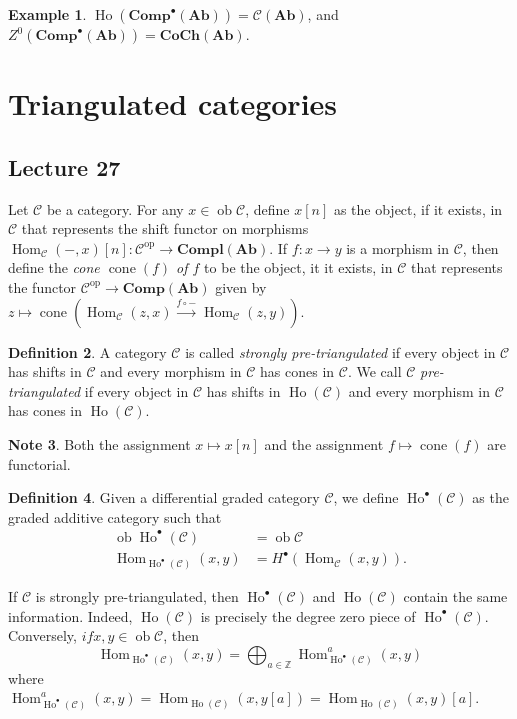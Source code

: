 \documentclass[10pt,letterpaper,cm]{nupset}
\theoremstyle{definition}
\newtheorem{definition}{Definition}[subsection]
\newtheorem{exmp}[definition]{Example}
\newtheorem{note}[definition]{Note}
\theoremstyle{theorem}
\theoremstyle{remark}
\newcommand{\Z}{\mathbb Z}
\newcommand{\1}{\mathbf{1}}
\renewcommand{\c}{\mathscr{C}}
\newcommand{\0}{\vec 0}
\DeclareMathOperator{\op}{op}
\DeclareMathOperator{\ob}{ob}
\DeclareMathOperator{\Hom}{Hom}
\DeclareMathOperator{\cone}{cone}
\DeclareMathOperator{\ho}{Ho}
\begin{document}
\begin{exmp}
$\ho(\mathbf{Comp}^{\bullet}(\mathbf{Ab})) = \mathcal{C}(\mathbf{Ab})$, and $Z^0(\mathbf{Comp}^{\bullet}(\mathbf{Ab})) = \mathbf{CoCh}(\mathbf{Ab})$.
\end{exmp}

\section{Triangulated categories}

\subsection{Lecture 27}


Let $\c$ be a category. For any $x\in \ob{\c}$, define $x[n]$ as the object, if it exists, in $\c$ that represents the shift functor on morphisms $\Hom_{\c}({-}, x)[n] :\c^{\op}\to \mathbf{Compl}(\mathbf{Ab})$. If $f : x\to y$ is a morphism in $\c$, then define the \textit{cone $\cone(f)$ of $f$} to be the object, it it exists, in $\c$ that represents the functor $\c^{\op} \to \mathbf{Comp}(\mathbf{Ab})$ given by $z \mapsto \cone(\Hom_{\c}(z,x) \overset{f \circ {-}}{\longrightarrow} \Hom_{\c}(z,y))$.  


\begin{definition}
A category $\c$ is called \textit{strongly pre-triangulated} if every object in $\c$ has shifts in $\c$ and every morphism in $\c$ has cones in $\c$. We call $\c$ \textit{pre-triangulated} if every object in $\c$ has shifts in $\ho(\c)$ and every morphism in $\c$ has cones in $\ho(\c)$.
\end{definition}

\begin{note}
Both the assignment $x \mapsto x[n]$ and the assignment $f \mapsto \cone(f)$ are functorial. 
\end{note}

\begin{definition}
Given a differential graded category $\c$, we define $\ho^{\bullet}(\c)$ as the graded additive category such that 
\begin{align*}
\ob{\ho^{\bullet}(\c)} & = \ob{\c}
\\ \Hom_{\ho^{\bullet}(\c)}(x,y) &= H^{\bullet}(\Hom_{\c}(x,y))
.\end{align*}
\end{definition}


If $\c$ is strongly pre-triangulated, then $\ho^{\bullet}(\c)$ and $\ho(\c)$ contain the same information. Indeed, $\ho(\c)$ is precisely the degree zero piece of $\ho^{\bullet}(\c)$. Conversely, $if x,y \in \ob{\c}$, then $$\Hom_{\ho^{\bullet}(\c)}(x,y) = \bigoplus_{a\in \Z}\Hom^a_{\ho^{\bullet}(\c)}(x,y)$$ where $\Hom_{\ho^{\bullet}(\c)}^a(x,y)  =  \Hom_{\ho(\c)}(x, y[a]) = \Hom_{\ho(\c)}(x,y)[a]$. 
\end{document}
